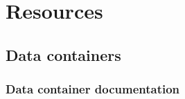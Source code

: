 \documentclass[
]{book}
\begin{document}
\hypertarget{resources}{%
\chapter{Resources}\label{resources}}

\hypertarget{data-containers-1}{%
\section{Data containers}\label{data-containers-1}}

\hypertarget{data-container-documentation}{%
\subsection{Data container documentation}\label{data-container-documentation}}
\end{document}
